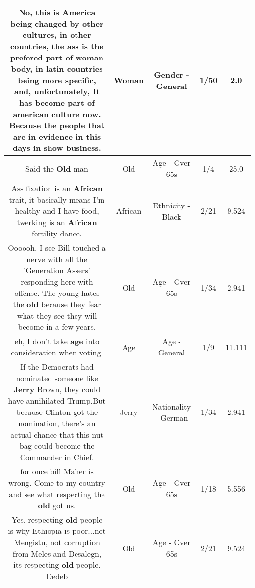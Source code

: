 \documentclass[11pt]{article}
\newlength\mylength
\begin{document}
\begin{center}
\begin{longtable}{|C{.65\mylength}|C{.30\mylength}|C{.12\mylength}|C{.12\mylength}|C{.12\mylength}|}
  \small No, this is America being changed by other cultures, in other countries, the ass is the prefered part of \textbf{woman} body, in latin countries being more specific, and, unfortunately, It has become part of american culture now. Because the people that are in evidence in this days in show business.\normalsize   & Woman & Gender - General & 1/50 & 2.0 \\  \hline
  \small Said the \textbf{Old} man\normalsize   & Old & Age - Over 65s & 1/4 & 25.0 \\  \hline
  \small Ass fixation is an \textbf{African} trait, it basically means I'm healthy and I have food, twerking is an \textbf{African} fertility dance.\normalsize   & African & Ethnicity - Black & 2/21 & 9.524 \\  \hline
  \small Oooooh. I see Bill touched a nerve with all the "Generation Assers" responding here with offense. The young hates the \textbf{old} because they fear what they see they will become in a few years.\normalsize   & Old & Age - Over 65s & 1/34 & 2.941 \\  \hline
  \small eh, I don't take \textbf{age} into consideration when voting.\normalsize   & Age & Age - General & 1/9 & 11.111 \\  \hline
  \small If the Democrats had nominated someone like \textbf{Jerry} Brown, they could have annihilated Trump.But because Clinton got the nomination, there's an actual chance that this nut bag could become the Commander in Chief.\normalsize   & Jerry & Nationality - German & 1/34 & 2.941 \\  \hline
  \small for once bill Maher is wrong.  Come to my country and see what respecting the \textbf{old} got us.\normalsize   & Old & Age - Over 65s & 1/18 & 5.556 \\  \hline
  \small Yes, respecting \textbf{old} people is why Ethiopia is poor...not Mengistu, not corruption from Meles and Desalegn, its respecting \textbf{old} people. Dedeb\normalsize   & Old & Age - Over 65s & 2/21 & 9.524 \\  \hline

\end{longtable}
\end{center}
\end{document}
